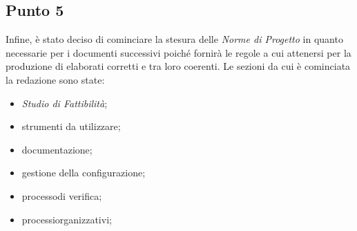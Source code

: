     \subsection{Punto 5}
        Infine, è stato deciso di cominciare la stesura delle \textit{Norme di Progetto} in quanto necessarie per i documenti successivi poiché fornirà le regole a cui attenersi per la produzione di elaborati corretti e tra loro coerenti. Le sezioni da cui è cominciata la redazione sono state:
        \begin{itemize}
            \item \textit{Studio di Fattibilità};
            \item strumenti da utilizzare;
            \item documentazione;
            \item gestione della configurazione;
            \item processo\glosp di verifica;
            \item processi\glosp organizzativi;
        \end{itemize}